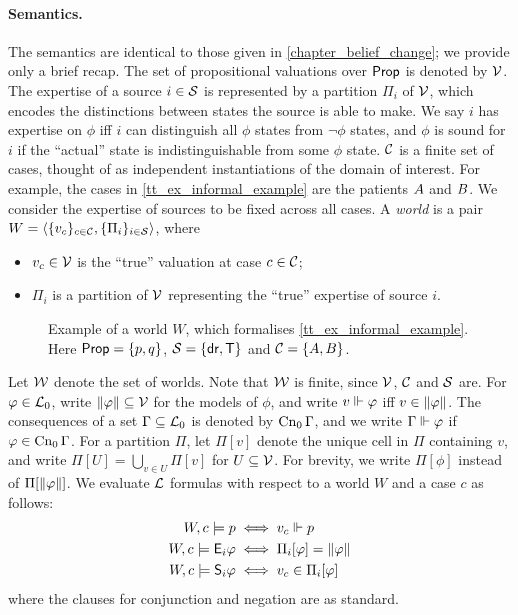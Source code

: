\paragraph{Semantics.}

The semantics are identical to those given in \cref{chapter_belief_change}; we
provide only a brief recap. The set of propositional valuations over
$\mathsf{Prop}$ is denoted by $\mathcal{V}$. The expertise of a source $i \in \mathcal{S}$ is
represented by a partition $\Pi_i$ of $\mathcal{V}$, which encodes the distinctions
between states the source is able to make. We say $i$ has expertise on $\phi$
iff $i$ can distinguish all $\phi$ states from $\neg\phi$ states, and $\phi$ is
sound for $i$ if the ``actual'' state is indistinguishable from some $\phi$
state. $\mathcal{C}$ is a finite set of cases, thought of as independent
instantiations of the domain of interest. For example, the cases in
\cref{tt_ex_informal_example} are the patients $A{}$ and $B{}$.
We consider the expertise of sources to be fixed across all cases.
%
A \emph{world} is a pair $W = \langle {\{v_c\}_{c \in \mathcal{C}},
\{\Pi_i\}_{i \in \mathcal{S}}} \rangle$, where
\begin{itemize}
    \item $v_c \in \mathcal{V}$ is the ``true'' valuation at case $c \in \mathcal{C}$;
    \item $\Pi_i$ is a partition of $\mathcal{V}$ representing the
          ``true'' expertise of source $i$.
\end{itemize}

\begin{figure}
    \centering
    
    \caption{
        Example of a world $W$, which formalises \cref{tt_ex_informal_example}.
        Here $\mathsf{Prop} = \{p, q\}$, $\mathcal{S} = \{\mathsf{dr}{}, \mathsf{T}{}\}$ and $\mathcal{C} =
        \{A{}, B{}\}$.
    }
    \label{tt_fig_example_world}
\end{figure}

Let $\mathcal{W}$ denote the set of worlds. Note that $\mathcal{W}$ is finite, since
$\mathcal{V}$, $\mathcal{C}$ and $\mathcal{S}$ are.
%
For $\varphi \in \mathcal{L}_0$, write $\|{\varphi}\| \subseteq \mathcal{V}$ for the
models of $\phi$, and write $v \Vdash \varphi$ iff $v \in \|{\varphi}\|$.
The consequences of a set $\Gamma \subseteq \mathcal{L}_0$ is denoted by
$\operatorname{Cn}_0{\Gamma}$, and we write $\Gamma \Vdash \varphi$ if $\varphi \in
\operatorname{Cn}_0{\Gamma}$.
%
For a partition $\Pi$, let $\Pi[v]$ denote the unique cell in $\Pi$ containing
$v$, and write $\Pi[U] = \bigcup_{v \in U}{\Pi[v]}$ for $U \subseteq
\mathcal{V}$. For brevity, we write $\Pi[\phi]$ instead of
$\Pi[\|{\varphi}\|]$. We evaluate $\mathcal{L}$ formulas with respect to a world $W$
and a case $c$ as follows:
\begin{align*}
    W, c \models p &\iff v_c \Vdash p \\
    W, c \models \mathsf{E}_i\varphi &\iff \Pi_i[\varphi] = \|{\varphi}\| \\
    W, c \models \mathsf{S}_i\varphi &\iff v_c \in \Pi_i[\varphi]
\end{align*}
where the clauses for conjunction and negation are as standard.

